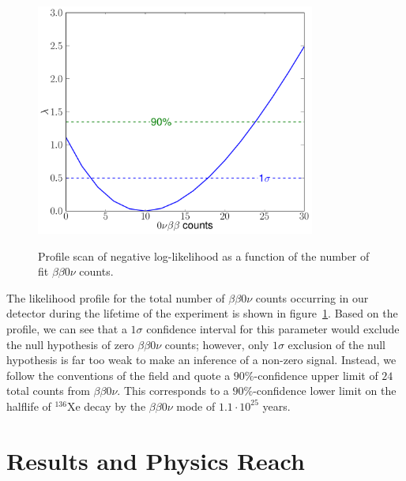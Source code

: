 \begin{figure}
\begin{center}
\includegraphics[keepaspectratio=true,height=3in]{0nubb_profile_frompaper.pdf}
\end{center}
\renewcommand{\baselinestretch}{1}
\small\normalsize
\begin{quote}
\caption{Profile scan of negative log-likelihood as a function of the number of fit $\beta\beta 0\nu$ counts.~\cite{NewEXObb0nPaper_2014}}
\label{fig:bb0nProfileFromPaper}
\end{quote}
\end{figure}
\renewcommand{\baselinestretch}{2}
\small\normalsize

The likelihood profile for the total number of $\beta\beta 0\nu$ counts occurring in our detector during the lifetime of the experiment is shown in figure~\ref{fig:bb0nProfileFromPaper}.  Based on the profile, we can see that a $1\sigma$ confidence interval for this parameter would exclude the null hypothesis of zero $\beta\beta 0\nu$ counts; however, only $1\sigma$ exclusion of the null hypothesis is far too weak to make an inference of a non-zero signal.  Instead, we follow the conventions of the field and quote a $90\%$-confidence upper limit of $24$ total counts from $\beta\beta 0\nu$.  This corresponds to a $90\%$-confidence lower limit on the halflife of $^{136}$Xe decay by the $\beta\beta 0\nu$ mode of $1.1 \cdot 10^{25}$ years.~\cite{NewEXObb0nPaper_2014}


\section{Results and Physics Reach}\label{sec:ResultResults}


